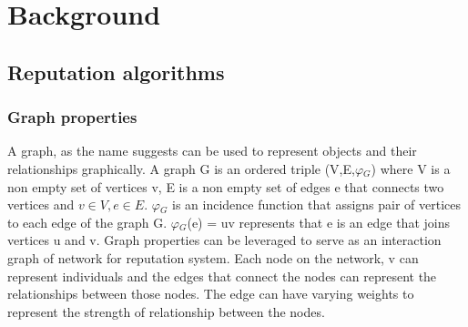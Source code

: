 \chapter{Background} \label{ch:background}
\section{Reputation algorithms} \label{sec:sectionlabel}
\subsection{Graph properties}
A graph, as the name suggests can be used to represent objects and their relationships 
graphically. A graph G is an ordered triple (V,E,$\varphi$$_{G}$) where V is a non empty set
of vertices v, E is a non empty set of edges e that connects two vertices and 
$v \in V, e \in E$. $\varphi$$_{G}$ is an incidence function that assigns pair of vertices
to each edge of the graph G. $\varphi$$_{G}$(e) = uv represents that e is an edge that 
joins vertices u and v. Graph properties can be leveraged to serve as an interaction 
graph of network for reputation system. Each node on the network, v can represent 
individuals and the edges that connect the nodes can represent the relationships 
between those nodes. The edge can have varying weights to represent the strength of 
relationship between the nodes. \cite{bondy1976graph}

